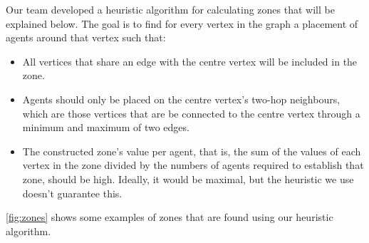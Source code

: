 Our team developed a heuristic algorithm for calculating zones that will be explained below.
The goal is to find for every vertex in the graph a placement of agents around that vertex such that:
\begin{itemize}
  \item All vertices that share an edge with the centre vertex will be included in the zone.
  \item Agents should only be placed on the centre vertex's two-hop neighbours, which are those vertices that are be connected to the centre vertex through a minimum and maximum of two edges.
  \item The constructed zone's value per agent, that is, the sum of the values of each vertex in the zone divided by the numbers of agents required to establish that zone, should be high.
        Ideally, it would be maximal, but the heuristic we use doesn't guarantee this.
\end{itemize}
\autoref{fig:zones} shows some examples of zones that are found using our heuristic algorithm.
